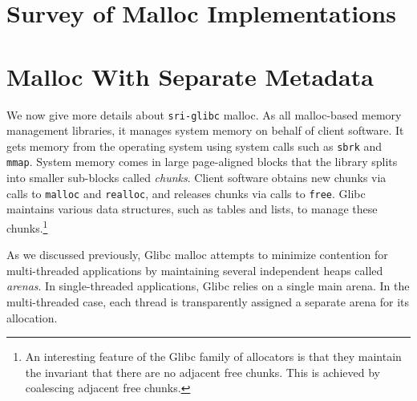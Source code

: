 \documentclass[twoside,12pt]{cslreport}
\begin{document}
{\small
 

}


\appendix

\chapter{Survey of Malloc Implementations}







\chapter{Malloc With Separate Metadata}
\label{malloc-details}


We now give more details about \texttt{sri-glibc} malloc. As all
malloc-based memory management libraries, it manages system memory on
behalf of client software. It gets memory from the operating system
using system calls such as \texttt{sbrk} and \texttt{mmap}. System
memory comes in large page-aligned blocks that the library splits into
smaller sub-blocks called \emph{chunks}. Client software obtains new
chunks via calls to \texttt{malloc} and \texttt{realloc}, and releases
chunks via calls to \texttt{free}. Glibc maintains various data
structures, such as tables and lists, to manage these
chunks.\footnote{An interesting feature of the Glibc family of
  allocators is that they maintain the invariant that there are no
  adjacent free chunks. This is achieved by coalescing adjacent free
  chunks.}

As we discussed previously, Glibc malloc attempts to minimize
contention for multi-threaded applications by maintaining several
independent heaps called \emph{arenas}. In single-threaded
applications, Glibc relies on a single main arena. In the
multi-threaded case, each thread is transparently assigned a separate
arena for its allocation.
\end{document}
